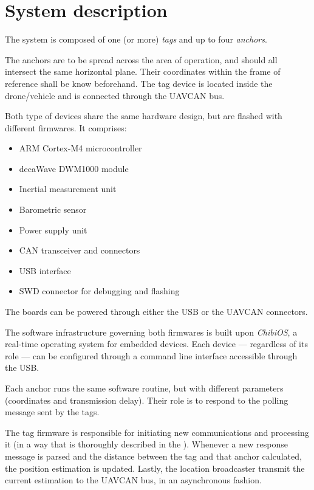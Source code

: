 \section{System description}

The system is composed of one (or more) \emph{tags} and up to four \emph{anchors}.

The anchors are to be spread across the area of operation, and should all intersect the same horizontal plane.
Their coordinates within the frame of reference shall be know beforehand.
The tag device is located inside the drone/vehicle and is connected through the UAVCAN bus.

Both type of devices share the same hardware design, but are flashed with different firmwares.
It comprises:
\begin{itemize}
\item ARM Cortex-M4 microcontroller
\item decaWave DWM1000 module
\item Inertial measurement unit
\item Barometric sensor
\item Power supply unit
\item CAN transceiver and connectors
\item USB interface
\item SWD connector for debugging and flashing
\end{itemize}
The boards can be powered through either the USB or the UAVCAN connectors.

The software infrastructure governing both firmwares is built upon \emph{ChibiOS}, a real-time operating system for embedded devices.
Each device --- regardless of its role --- can be configured through a command line interface accessible through the USB.

Each anchor runs the same software routine, but with different parameters (coordinates and transmission delay).
Their role is to respond to the polling message sent by the tags.

The tag firmware is responsible for initiating new communications and processing it (in a way that is thoroughly described in the ).
Whenever a new response message is parsed and the distance between the tag and that anchor calculated, the position estimation is updated.
Lastly, the location broadcaster transmit the current estimation to the UAVCAN bus, in an asynchronous fashion.
